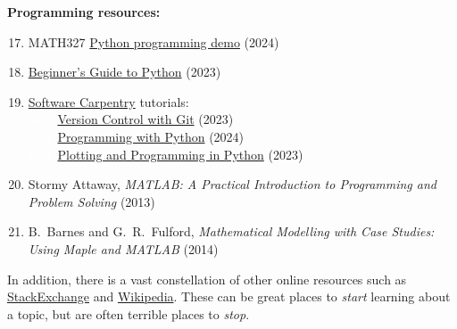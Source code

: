 \noindent\textbf{Programming resources:} \\[-24 pt]
\begin{enumerate}
  \setcounter{enumi}{16}
  \item MATH327 \href{https://tinyurl.com/math327demo}{Python programming demo} (2024)
  \item \href{https://wiki.python.org/moin/BeginnersGuide}{Beginner's Guide to Python} (2023)
  \item \href{https://software-carpentry.org}{Software Carpentry} tutorials: \\
        \textcolor{white}{hack} \href{https://swcarpentry.github.io/git-novice/}{Version Control with Git} (2023) \\
        \textcolor{white}{hack} \href{https://swcarpentry.github.io/python-novice-inflammation/}{Programming with Python} (2024) \\
        \textcolor{white}{hack} \href{https://swcarpentry.github.io/python-novice-gapminder/}{Plotting and Programming in Python} (2023)
  \item Stormy Attaway, \textit{MATLAB: A Practical Introduction to Programming and Problem Solving} (2013)
  \item B.~Barnes and G.~R.~Fulford, \textit{Mathematical Modelling with Case Studies: Using Maple and MATLAB} (2014)
\end{enumerate}

In addition, there is a vast constellation of other online resources such as \href{https://physics.stackexchange.com/questions/tagged/statistical-mechanics}{StackExchange} and \href{https://en.wikipedia.org/wiki/Statistical_physics}{Wikipedia}.
These can be great places to \emph{start} learning about a topic, but are often terrible places to \emph{stop}.
